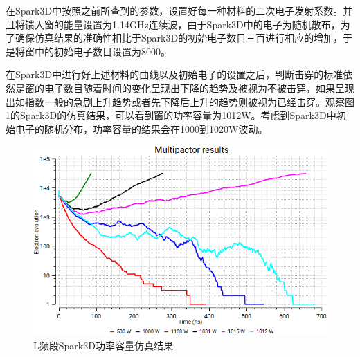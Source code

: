 \documentclass[master]{thesis-uestc}
\begin{document}
在Spark3D中按照之前所查到的参数，设置好每一种材料的二次电子发射系数。并且将馈入窗的能量设置为1.14GHz连续波，由于Spark3D中的电子为随机散布，为了确保仿真结果的准确性相比于Spark3D的初始电子数目三百进行相应的增加，于是将窗中的初始电子数目设置为8000。

在Spark3D中进行好上述材料的曲线以及初始电子的设置之后，判断击穿的标准依然是窗的电子数目随着时间的变化呈现出下降的趋势及被视为不被击穿，如果呈现出如指数一般的急剧上升趋势或者先下降后上升的趋势则被视为已经击穿。观察图\ref{fig:L频段Spark3D功率容量仿真结果}的Spark3D的仿真结果，可以看到窗的功率容量为1012W。考虑到Spark3D中初始电子的随机分布，功率容量的结果会在1000到1020W波动。
\begin{figure}[!htb]
    \centering
    \includegraphics[width=0.45\linewidth]{pic/chapter4/Spark3D中的电子随时间的变化.png}
    \caption{L频段Spark3D功率容量仿真结果}
    \label{fig:L频段Spark3D功率容量仿真结果}
\end{figure}
\end{document}
